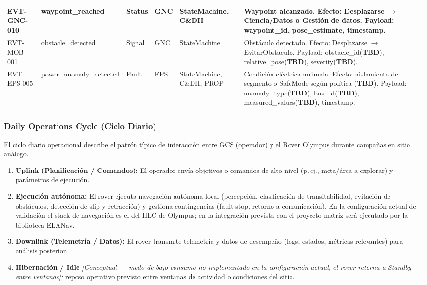 \begin{landscape}
\begin{longtable}{|p{2.0cm}|p{3.5cm}|p{1.4cm}|p{2.8cm}|p{3.2cm}|p{8.5cm}|}
EVT-GNC-010 & waypoint\_reached & Status & GNC & StateMachine, C\&DH &
Waypoint alcanzado. Efecto: Desplazarse $\rightarrow$ Ciencia/Datos o Gestión de datos.
Payload: waypoint\_id, pose\_estimate, timestamp. \\
\hline

EVT-MOB-001 & obstacle\_detected & Signal & GNC & StateMachine &
Obstáculo detectado. Efecto: Desplazarse $\rightarrow$ EvitarObstaculo.
Payload: obstacle\_id(\textbf{TBD}), relative\_pose(\textbf{TBD}), severity(\textbf{TBD}). \\
\hline

EVT-EPS-005 & power\_anomaly\_detected & Fault & EPS & StateMachine, C\&DH, PROP &
Condición eléctrica anómala. Efecto: aislamiento de segmento o SafeMode según política (\textbf{TBD}).
Payload: anomaly\_type(\textbf{TBD}), bus\_id(\textbf{TBD}), measured\_values(\textbf{TBD}), timestamp. \\
\hline

\end{longtable}
\end{landscape}



\subsubsection{Daily Operations Cycle (Ciclo Diario)}\label{subsec:daily_ops}

El ciclo diario operacional describe el patrón típico de interacción entre GCS (operador) y el Rover Olympus durante campañas en sitio análogo.

\begin{enumerate}
    \item \textbf{Uplink (Planificación / Comandos):} El operador envía objetivos o comandos de alto nivel (p.\,ej., meta/área a explorar) y parámetros de ejecución.
    \item \textbf{Ejecución autónoma:} El rover ejecuta navegación autónoma local (percepción, clasificación de transitabilidad, evitación de obstáculos, detección de slip y retracción) y gestiona contingencias (fault stop, retorno a comunicación). En la configuración actual de validación el stack de navegación es el del HLC de Olympus; en la integración prevista con el proyecto matriz será ejecutado por la biblioteca ELANav.
    \item \textbf{Downlink (Telemetría / Datos):} El rover transmite telemetría y datos de desempeño (logs, estados, métricas relevantes) para análisis posterior.
    \item \textbf{Hibernación / Idle} \emph{[Conceptual --- modo de bajo consumo no implementado en la configuración actual; el rover retorna a Standby entre ventanas]:} reposo operativo previsto entre ventanas de actividad o condiciones del sitio.
\end{enumerate}


